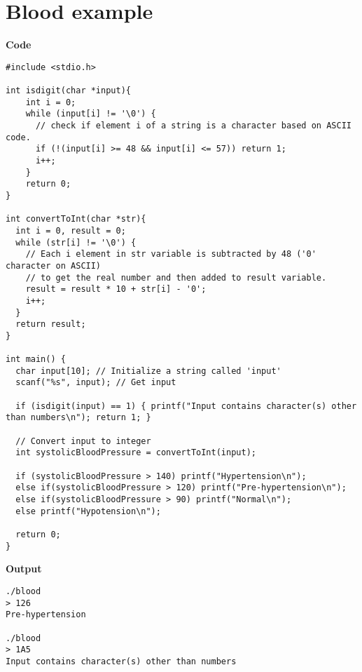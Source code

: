 \documentclass[a4paper, 10pt]{article}
\begin{document}
    \section*{Blood example}
    \large \textbf{Code}
    \begin{lstlisting}[style=code]
#include <stdio.h>

int isdigit(char *input){
    int i = 0;
    while (input[i] != '\0') {
      // check if element i of a string is a character based on ASCII code.
      if (!(input[i] >= 48 && input[i] <= 57)) return 1; 
      i++;
    }
    return 0;
}

int convertToInt(char *str){
  int i = 0, result = 0;
  while (str[i] != '\0') {
    // Each i element in str variable is subtracted by 48 ('0' character on ASCII)
    // to get the real number and then added to result variable.
    result = result * 10 + str[i] - '0'; 
    i++;
  }
  return result;
}

int main() {
  char input[10]; // Initialize a string called 'input'
  scanf("%s", input); // Get input

  if (isdigit(input) == 1) { printf("Input contains character(s) other than numbers\n"); return 1; }

  // Convert input to integer
  int systolicBloodPressure = convertToInt(input); 

  if (systolicBloodPressure > 140) printf("Hypertension\n");
  else if(systolicBloodPressure > 120) printf("Pre-hypertension\n");
  else if(systolicBloodPressure > 90) printf("Normal\n");
  else printf("Hypotension\n");

  return 0;
}
    \end{lstlisting}

    \vspace{0.5cm}

    \large \textbf{Output}
    \begin{lstlisting}[style=output]
./blood
> 126
Pre-hypertension

./blood
> 1A5
Input contains character(s) other than numbers
    \end{lstlisting}
\end{document}
